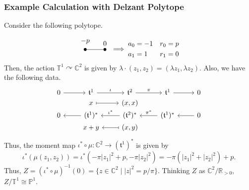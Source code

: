 \documentclass[b5paper]{article}
\newcommand{\acton}{\curvearrowright}
\begin{document}
\subsubsection*{Example Calculation with Delzant Polytope}

\begin{example}{}
    Consider the following polytope.
    \begin{equation*}
        \begin{tikzpicture}[every node/.style={circle,fill=black,minimum width=1.5pt,inner sep=1.5pt}]
            \node[label={$-p$}] (A) at (0,0) {};
            \node[label={$0$}] (B) at (1,0) {};
            \draw (A) -- (B);
        \end{tikzpicture}
        \implies
        \begin{aligned}
            a_0 &= -1 & r_0 &= p \\
            a_1 &= 1 & r_1 &= 0
        \end{aligned}
    \end{equation*}
    Then, the action $\mathbb{T}^1 \acton \mathbb{C}^2$ is given by $\lambda \cdot (z_1, z_2) = (\lambda z_1, \lambda z_2)$. Also, we have the following data.
    \begin{equation*}
        \begin{tikzcd}[row sep=0ex]
            0 \arrow[r] & \mathfrak{t}^1 \arrow[r, "\iota"] & \mathfrak{t}^2 \arrow[r, "\pi"] & \mathfrak{t}^1 \arrow[r] & 0 \\
            {} & x \arrow[r, maps to] & (x, x) & {} & {} \\
            0 & (\mathfrak{t}^1)^* \arrow[l] & (\mathfrak{t}^2)^* \arrow[l, "\iota^*"'] & (\mathfrak{t}^1)^* \arrow[l, "\pi^*"'] & 0 \arrow[l] \\
            {} & x+y & (x, y) \arrow[l, maps to] & {} & {}
        \end{tikzcd}
    \end{equation*}
    Thus, the moment map $\iota^* \circ \mu : \mathbb{C}^2 \to (\mathfrak{t}^1)^*$ is given by
    \begin{equation*}
        \iota^*(\mu(z_1, z_2)) = \iota^*(-\pi|z_1|^2+p, -\pi|z_2|^2) = -\pi(|z_1|^2+|z_2|^2) + p.
    \end{equation*}
    Thus, $Z = (\iota^* \circ \mu)^{-1}(0) = \{ z \in \mathbb{C}^2 \mid |z|^2 = p/\pi \}$. Thinking $Z$ as $\mathbb{C}^2 / \mathbb{R}_{>0}$, $Z/\mathbb{T}^1 \cong \mathbb{P}^1$.
\end{example}
\end{document}
